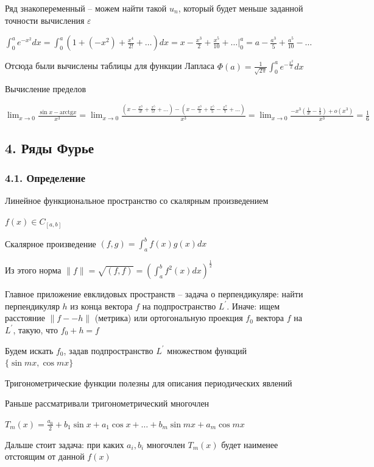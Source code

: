 \documentclass[12pt]{article}
\begin{document}
    Ряд знакопеременный -- можем найти такой $u_n$, который будет меньше заданной точности вычисления $\varepsilon$

     $\int_0^{a} e^{-x^2} dx = \int_0^a (1 + (-x^2) + \frac{x^4}{2!} + \dots) dx = x - \frac{x^3}{2} + \frac{x^5}{10} + \dots \Big|_0^a = a - \frac{a^3}{5} + \frac{a^5}{10} - \dots$

    Отсюда были вычислены таблицы для функции Лапласа $\Phi(a) = \frac{1}{\sqrt{2\pi}} \int_0^a e^{-\frac{x^2}{2}} dx$

     Вычисление пределов

    $\lim_{x \to 0} \frac{\sin x - \mathrm{arctg} x}{x^3} = \lim_{x \to 0} \frac{(x - \frac{x^3}{3!} + \frac{x^5}{5!} + \dots) - (x - \frac{x^3}{3} + \frac{x^5}{5} - \frac{x^7}{7} + \dots)}{x^3} = 
    \lim_{x \to 0} \frac{-x^3 (\frac{1}{3!} - \frac{1}{3}) + o(x^3)}{x^3} = \frac{1}{6}$

    \subsection{4. Ряды Фурье}

    \subsubsection{4.1. Определение}

    \Mem Линейное функциональное пространство со скалярным произведением

    $f(x) \in C_{[a,b]}$

    Скалярное произведение $(f, g) = \int_a^b f(x)g(x) dx$

    Из этого норма $\|f\| = \sqrt{(f,f)} = \left(\int_a^b f^2(x) dx\right)^\frac{1}{2}$

    Главное приложение евклидовых пространств -- задача о перпендикуляре: найти перпендикуляр $h$ из конца вектора $f$ на подпространство $L^\prime$.
    Иначе: ищем расстояние $\|f -- h\|$ (метрика) или ортогональную проекция $f_0$ вектора $f$ на $L^\prime$, такую, что $f_0 + h = f$

    Будем искать $f_0$, задав подпространство $L^\prime$ множеством функций $\{\sin mx, \cos mx\}$

    Тригонометрические функции полезны для описания периодических явлений

    Раньше рассматривали тригонометрический многочлен

    $T_m(x) = \frac{a_0}{2} + b_1 \sin x + a_1 \cos x + \dots + b_m \sin mx + a_m \cos mx$

    Дальше стоит задача: при каких $a_i, b_i$ многочлен $T_m(x)$ будет наименее отстоящим от данной $f(x)$

\end{document}
